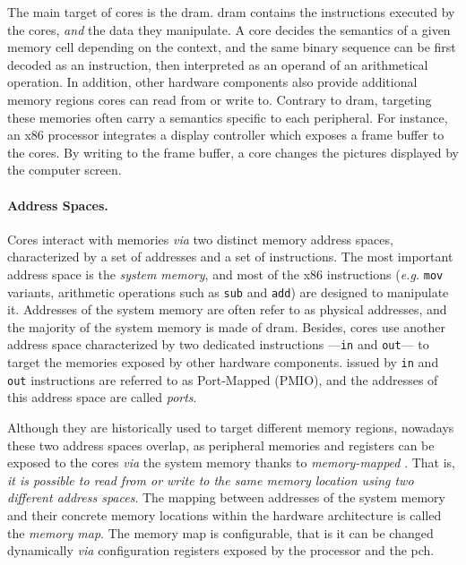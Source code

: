 The main target of cores \IOs is the \ac{dram}.
%
\ac{dram} contains the instructions executed by the cores, \emph{and} the data
they manipulate.
%
A core decides the semantics of a given memory cell depending on the context,
and the same binary sequence can be first decoded as an instruction, then
interpreted as an operand of an arithmetical operation.
%
In addition, other hardware components also provide additional memory regions
cores can read from or write to.
%
Contrary to \ac{dram}, \IOs targeting these memories often carry a semantics
specific to each peripheral.
%
For instance, an x86 processor integrates a display controller which exposes a
frame buffer to the cores.
%
By writing to the frame buffer, a core changes the pictures displayed by the
computer screen.

\paragraph{Address Spaces.}
%
Cores interact with memories \emph{via} two distinct memory address spaces,
characterized by a set of addresses and a set of instructions.
%
The most important address space is the \emph{system memory}, and most of the
x86 instructions (\emph{e.g.} \texttt{mov} variants, arithmetic operations such
as \texttt{sub} and \texttt{add}) are designed to manipulate it.
%
Addresses of the system memory are often refer to as physical addresses, and the
majority of the system memory is made of \ac{dram}.
%
Besides, cores use another address space characterized by two dedicated
instructions ---\texttt{in} and \texttt{out}--- to target the memories exposed
by other hardware components.
%
\IOs issued by \texttt{in} and \texttt{out} instructions are referred to as
Port-Mapped \IOs (PMIO), and the addresses of this address space are called
\emph{ports}.

Although they are historically used to target different memory regions, nowadays
these two address spaces overlap, as peripheral memories and registers can be
exposed to the cores \emph{via} the system memory thanks to \emph{memory-mapped}
\IOs.
%
That is, \emph{it is possible to read from or write to the same memory location
  using two different address spaces}.
%
%
%
The mapping between addresses of the system memory and their concrete memory
locations within the hardware architecture is called the \emph{memory map}.
%
The memory map is configurable, that is it can be changed dynamically \emph{via}
configuration registers exposed by the processor and the \ac{pch}.

